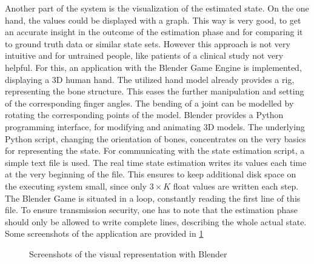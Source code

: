 Another part of the system is the visualization of the estimated state. On the one hand, the values could be displayed with a graph. This way is very good, to get an accurate insight in the outcome of the estimation phase and for comparing it to ground truth data or similar state sets. However this approach is not very intuitive and for untrained people, like patients of a clinical study not very helpful. For this, an application with the Blender Game Engine \cite{blender} is implemented, displaying a 3D human hand. The utilized hand model already provides a rig, representing the bone structure. This eases the further manipulation and setting of the corresponding finger angles. The bending of a joint can be modelled by rotating the corresponding points of the model. Blender provides a Python programming interface, for modifying and animating 3D models. The underlying Python script, changing the orientation of bones, concentrates on the very basics for representing the state. For communicating with the state estimation script, a simple text file is used. The real time state estimation writes its values each time at the very beginning of the file. This ensures to keep additional disk space on the executing system small, since only $ 3 \times K $ float values are written each step. The Blender Game is situated in a loop, constantly reading the first line of this file. To ensure transmission security, one has to note that the estimation phase should only be allowed to write complete lines, describing the whole actual state. Some screenshots of the application are provided in \ref{fig:blendGame}

\begin{figure}[h]
\centering
{}
\hfill
{}
\caption{Screenshots of the visual representation with Blender}
\label{fig:blendGame}
\end{figure}

\FloatBarrier